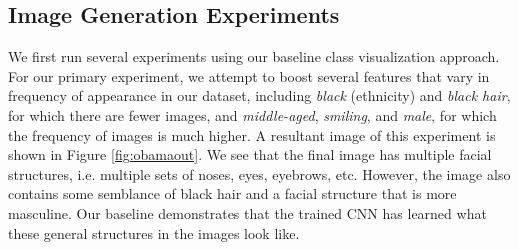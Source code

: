 \documentclass[10pt,twocolumn,letterpaper]{article}
\begin{document}
\subsection{Image Generation Experiments}
We first run several experiments using our baseline class visualization approach. For our primary experiment, we attempt to boost several features that vary in frequency of appearance in our dataset, including \textit{black} (ethnicity) and \textit{black hair}, for which there are fewer images, and \textit{middle-aged}, \textit{smiling}, and \textit{male}, for which the frequency of images is much higher. A resultant image of this experiment is shown in Figure \ref{fig:obamaout}. We see that the final image has multiple facial structures, i.e. multiple sets of noses, eyes, eyebrows, etc. However, the image also contains some semblance of black hair and a facial structure that is more masculine. Our baseline demonstrates that the trained CNN has learned what these general structures in the images look like. 
\end{document}
